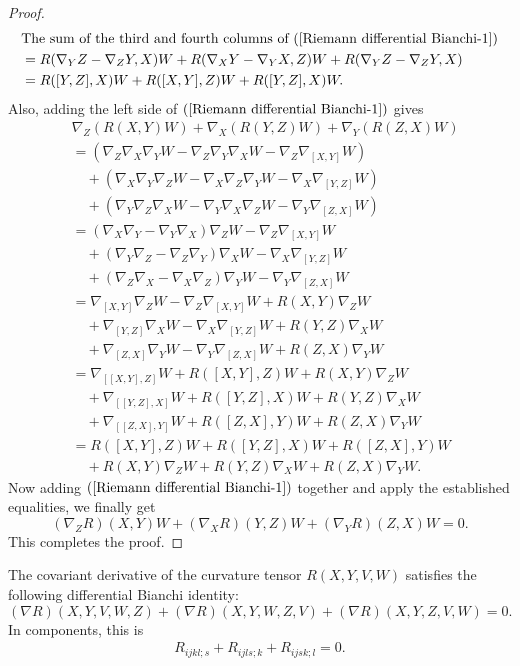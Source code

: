 \begin{proof}
\begin{align*}
&\text{The sum of the third and fourth columns of $(\ref{Riemann differential Bianchi-1})$}\\
&=R(\nabla_YZ-\nabla_ZY,X)W+R(\nabla_XY-\nabla_YX,Z)W+R(\nabla_YZ-\nabla_ZY,X)\\
&=R([Y,Z],X)W+R([X,Y],Z)W+R([Y,Z],X)W.
\end{align*}
Also, adding the left side of $(\ref{Riemann differential Bianchi-1})$ gives
\begin{align*}
&\nabla_Z(R(X,Y)W)+\nabla_X(R(Y,Z)W)+\nabla_Y(R(Z,X)W)\\
&=(\nabla_Z\nabla_X\nabla_YW-\nabla_Z\nabla_Y\nabla_XW-\nabla_Z\nabla_{[X,Y]}W)\\
&\quad +(\nabla_X\nabla_Y\nabla_ZW-\nabla_X\nabla_Z\nabla_YW-\nabla_X\nabla_{[Y,Z]}W)\\
&\quad +(\nabla_Y\nabla_Z\nabla_XW-\nabla_Y\nabla_X\nabla_ZW-\nabla_Y\nabla_{[Z,X]}W)\\
&=(\nabla_X\nabla_Y-\nabla_Y\nabla_X)\nabla_ZW-\nabla_Z\nabla_{[X,Y]}W\\
&\quad +(\nabla_Y\nabla_Z-\nabla_Z\nabla_Y)\nabla_XW-\nabla_X\nabla_{[Y,Z]}W\\
&\quad +(\nabla_Z\nabla_X-\nabla_X\nabla_Z)\nabla_YW-\nabla_Y\nabla_{[Z,X]}W\\
&=\nabla_{[X,Y]}\nabla_ZW-\nabla_Z\nabla_{[X,Y]}W+R(X,Y)\nabla_ZW\\
&\quad +\nabla_{[Y,Z]}\nabla_XW-\nabla_X\nabla_{[Y,Z]}W+R(Y,Z)\nabla_XW\\
&\quad +\nabla_{[Z,X]}\nabla_YW-\nabla_Y\nabla_{[Z,X]}W+R(Z,X)\nabla_YW\\
&=\nabla_{[[X,Y],Z]}W+R([X,Y],Z)W+R(X,Y)\nabla_ZW\\
&\quad +\nabla_{[[Y,Z],X]}W+R([Y,Z],X)W+R(Y,Z)\nabla_XW\\
&\quad +\nabla_{[[Z,X],Y]}W+R([Z,X],Y)W+R(Z,X)\nabla_YW\\
&=R([X,Y],Z)W+R([Y,Z],X)W+R([Z,X],Y)W\\
&\quad +R(X,Y)\nabla_ZW+R(Y,Z)\nabla_XW+R(Z,X)\nabla_YW.
\end{align*}
Now adding $(\ref{Riemann differential Bianchi-1})$ together and apply the established equalities, we finally get
\[(\nabla_ZR)(X,Y)W+(\nabla_XR)(Y,Z)W+(\nabla_YR)(Z,X)W=0.\]
This completes the proof.
\end{proof}
\begin{corollary}
The covariant derivative of the curvature tensor $R(X,Y,V,W)$ satisfies the following differential Bianchi identity:
\[(\nabla R)(X,Y,V,W,Z)+(\nabla R)(X,Y,W,Z,V)+(\nabla R)(X,Y,Z,V,W)=0.\]
In components, this is
\begin{align}\label{Riemann differential Bianchi (0,4)}
R_{ijkl;s}+R_{ijls;k}+R_{ijsk;l}=0.
\end{align}
\end{corollary}
